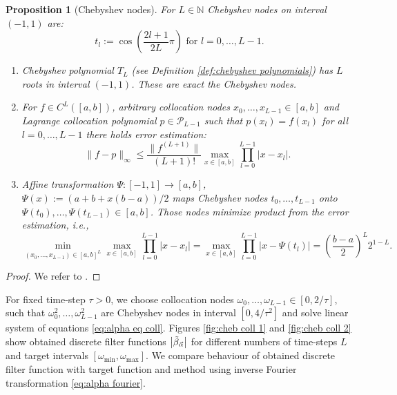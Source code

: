 \documentclass[a4paper,11pt,bibliography=totoc,listof=totoc,headinclude=true,cleardoublepage=empty,oneside]{scrbook}
\newtheorem{prop}[theorem]{Proposition}
\newcommand{\N}{\mathbb{N}}
\newcommand{\dffv}{\Tilde{\beta}_{\Vec{\alpha}}}
\begin{document}
\begin{prop}[Chebyshev nodes] \label{def:chebyshev nodes}
    For $L\in\N$ Chebyshev nodes on interval $(-1, 1)$ are:
    \begin{equation*}
        t_l := \cos\left(\frac{2l+1}{2L}\pi\right) \text{ for } l = 0, \dots, L-1.
    \end{equation*}
    \begin{enumerate}
        \item Chebyshev polynomial $T_L$ (see Definition \ref{def:chebyshev polynomials}) has $L$ roots in interval $(-1, 1)$. These are exact the Chebyshev nodes.
        \item For $f \in C^{L}\left([a,b]\right)$, arbitrary collocation nodes $x_0, \dots, x_{L-1} \in [a,b]$ and Lagrange collocation polynomial $p\in \mathcal{P}_{L-1}$ such that $p(x_l) = f(x_l)$ for all $l=0, \dots, L-1$ there holds error estimation:
        \begin{equation}\label{eq:lagrange error est}
            \|f-p\|_\infty \leqslant \frac{\|f^{(L+1)}\|}{(L+1)!} \max_{x\in[a,b]} \prod_{l=0}^{L-1} \left|x-x_l\right|.
        \end{equation}
        \item Affine transformation $\Psi: [-1, 1] \rightarrow [a,b]$, $\Psi(x) := \left(a+b+x(b-a)\right)/2$ maps Chebyshev nodes $t_0, \dots, t_{L-1}$ onto $\Psi(t_0), \dots, \Psi(t_{L-1}) \in [a,b]$. Those nodes minimize product from the error estimation, i.e.,
        \begin{equation*}
            \min_{(x_0, \dots, x_{L-1})\in [a,b]^L}  \max_{x\in[a,b]} \prod_{l=0}^{L-1} \left|x-x_l\right| =  \max_{x\in[a,b]} \prod_{l=0}^{L-1} \left|x-\Psi(t_l)\right| = \left(\frac{b-a}{2}\right)^{L} 2^{1-L}.
        \end{equation*}
    \end{enumerate}
\end{prop}
\begin{proof}
    We refer to \cite[p. 23--24]{numericsAB}.
\end{proof}

For fixed time-step $\tau>0$, we choose collocation nodes $\omega_0, \dots, \omega_{L-1} \in \left[0, 2/\tau\right]$, such that $\omega_0^2, \dots, \omega_{L-1}^2$ are Chebyshev nodes in interval $\left[0, 4/\tau^2\right]$ and solve linear system of equations \eqref{eq:alpha eq coll}. Figures \ref{fig:cheb coll 1} and \ref{fig:cheb coll 2} show obtained discrete filter functions $\left|\dffv\right|$ for different numbers of time-steps $L$ and target intervals $\left[\omega_{\min}, \omega_{\max} \right]$. We compare behaviour of obtained discrete filter function with target function and method using inverse Fourier transformation \eqref{eq:alpha fourier}.
\end{document}
